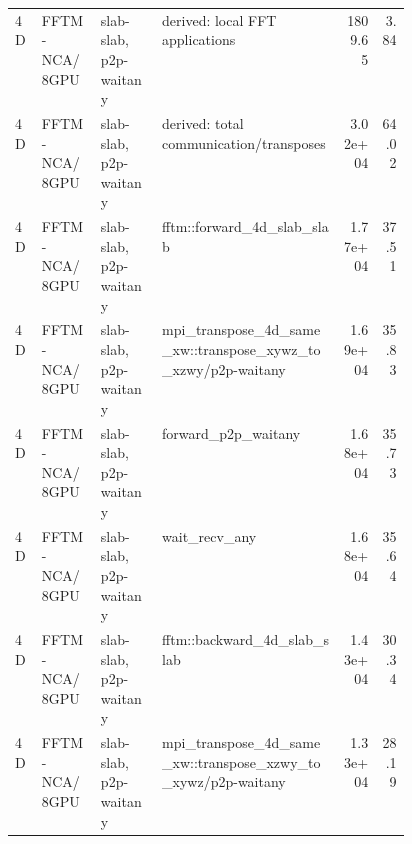 \documentclass{article}
\begin{document}
\begin{center}
{\begin{tabular}{lll p{0.46\linewidth} rr}
4D & FFTM-NCA/8GPU & slab-slab, p2p-waitany & derived: local FFT applications & 1809.65 & 3.84 \\
4D & FFTM-NCA/8GPU & slab-slab, p2p-waitany & derived: total communication/transposes & 3.02e+04 & 64.02 \\
4D & FFTM-NCA/8GPU & slab-slab, p2p-waitany & fftm::forward\_4d\_slab\_slab & 1.77e+04 & 37.51 \\
4D & FFTM-NCA/8GPU & slab-slab, p2p-waitany & mpi\_transpose\_4d\_same\_xw::transpose\_xywz\_to\_xzwy/p2p-waitany & 1.69e+04 & 35.83 \\
4D & FFTM-NCA/8GPU & slab-slab, p2p-waitany & forward\_p2p\_waitany & 1.68e+04 & 35.73 \\
4D & FFTM-NCA/8GPU & slab-slab, p2p-waitany & wait\_recv\_any & 1.68e+04 & 35.64 \\
4D & FFTM-NCA/8GPU & slab-slab, p2p-waitany & fftm::backward\_4d\_slab\_slab & 1.43e+04 & 30.34 \\
4D & FFTM-NCA/8GPU & slab-slab, p2p-waitany & mpi\_transpose\_4d\_same\_xw::transpose\_xzwy\_to\_xywz/p2p-waitany & 1.33e+04 & 28.19 \\
\hline
\end{tabular}
}
\end{center}
\end{document}
